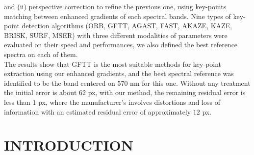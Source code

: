 \documentclass[a4paper,twoside]{article}
\begin{document}
{		and (ii) perspective correction to refine the previous one, using key-points matching between enhanced gradients of each spectral bands.
		Nine types of key-point detection algorithms (ORB, GFTT, AGAST, FAST, AKAZE, KAZE, BRISK, SURF, MSER) with three different modalities of parameters
		were evaluated on their speed and performances, we also defined the best reference spectra on each of them.
		\\
		The results show that GFTT is the most suitable methods for key-point extraction using our enhanced gradients,
		and the best spectral reference was identified to be the band centered on 570 nm for this one.
		Without any treatment the initial error is about $62$ px, with our method, the remaining residual error is less than $1$ px,
		where the manufacturer's involves distortions and loss of information with an estimated residual error of approximately $12$ px.
	}

	\onecolumn \maketitle \normalsize \setcounter{footnote}{0} \vfill
	
	\section{\uppercase{Introduction}}
	
\end{document}
